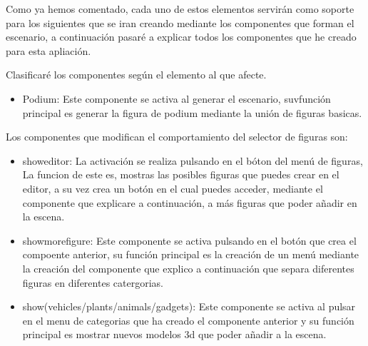 \documentclass[a4paper, 12pt]{book}
\begin{document}
Como ya hemos comentado, cada uno de estos elementos servirán como soporte para los siguientes que se iran creando mediante los componentes que forman el escenario, a continuación pasaré a explicar todos los componentes que  he creado para esta apliación.

Clasificaré los componentes según el elemento al que afecte.


\begin{itemize}
    \item Podium: Este componente se activa al generar el escenario, suvfunción principal es generar la figura de podium mediante la unión de figuras basicas.
\end{itemize}

Los componentes que modifican el comportamiento del selector de figuras son:
\begin{itemize}
    \item showeditor: La activación se realiza pulsando en el bóton del menú de figuras, La funcion de este es, mostras las posibles figuras que puedes crear en el editor, a su vez crea un botón en el cual puedes acceder, mediante el componente que explicare a continuación, a más figuras que poder añadir en la escena.
    \item showmorefigure: Este componente se activa pulsando en el botón que crea el compoente anterior, su función principal es la creación de un menú mediante la creación del componente que explico a continuación  que separa diferentes figuras en diferentes catergorias.
    \item show(vehicles/plants/animals/gadgets): Este componente se activa al pulsar en el menu de categorias que ha creado el componente anterior y su función principal es mostrar nuevos modelos 3d que poder añadir a la escena.

\end{itemize}
\end{document}
